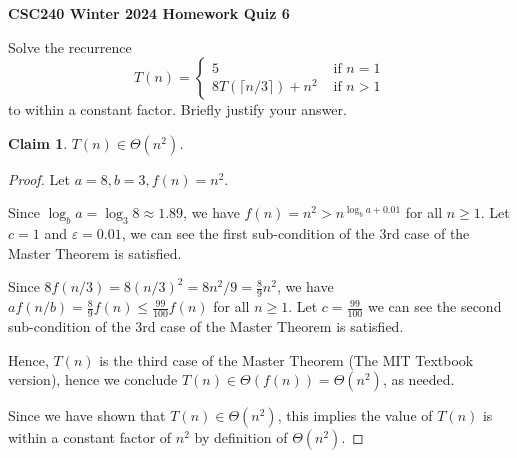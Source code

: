 \documentclass[11pt]{article}
\newtheorem*{claim}{Claim}
\begin{document}
\begin{center}
{\bf \Large \bf CSC240 Winter 2024 Homework Quiz 6}\\
\end{center}

Solve the recurrence
\[
    T(n) = \left\{ \begin{array}{ll}
    5 & \mbox{ if } n = 1\\
    8 T(\lceil n/3 \rceil) + n^2 & \mbox{ if } n >1
    \end{array} \right .
\]
to within a constant factor.  Briefly justify your answer.

\begin{claim}
    $T(n) \in \Theta(n^2)$.
\end{claim}

\begin{proof}
    Let $a=8, b=3, f(n) = n^2$. 

    Since $\log_b a = \log_3 8 \approx 1.89$, we have $f(n)=n^2 > n^{\log_b a+0.01}$ for all $n \geq 1$. Let $c=1$ and $\varepsilon=0.01$, we can see the first sub-condition of the 3rd case of the Master Theorem is satisfied.

    Since $8 f(n/3) = 8 (n/3)^2 = 8n^2/9=\frac{8}{9}n^2$, we have $a f(n / b)=\frac{8}{9}f(n)\leq \frac{99}{100}f(n)$ for all $n \geq 1$. Let $c=\frac{99}{100}$ we can see the second sub-condition of the 3rd case of the Master Theorem is satisfied.

    Hence, $T(n)$ is the third case of the Master Theorem (The MIT Textbook version), hence we conclude $T(n)\in\Theta(f(n))=\Theta(n^2)$, as needed.

    Since we have shown that $T(n)\in\Theta(n^2)$, this implies the value of $T(n)$ is within a constant factor of $n^2$ by definition of $\Theta(n^2)$.
\end{proof}
\end{document}

